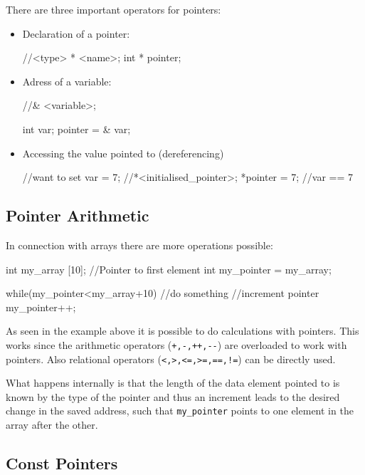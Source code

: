 \documentclass[10pt,a4paper]{scrartcl}
\begin{document}
\begin{multicols*}{2}
There are three important operators for pointers:

\begin{itemize}
\item Declaration of a pointer: 

\begin{TPCpp}
//<type> * <name>;
int * pointer;
\end{TPCpp}

\item Adress of a variable:

\begin{TPCpp}
//& <variable>;

int var;
pointer = & var;
\end{TPCpp}

\item Accessing the value pointed to (dereferencing)

\begin{TPCpp}
//want to set var = 7;
//*<initialised_pointer>;
*pointer = 7; //var == 7
\end{TPCpp}
\end{itemize}

\subsection{Pointer Arithmetic}
\label{sec:PointerArithmetic}

In connection with arrays there are more operations possible:

\begin{TPCpp}
int my_array [10];
//Pointer to first element
int my_pointer = my_array;

while(my_pointer<my_array+10){
	//do something
	//increment pointer
	my_pointer++;
}
\end{TPCpp}

As seen in the example above it is possible to do calculations with pointers. This works since the arithmetic operators (\verb.+,-,++,--.) are overloaded to work with pointers. Also relational operators (\verb.<,>,<=,>=,==,!=.) can be directly used.

What happens internally is that the length of the data element pointed to is known by the type of the pointer and thus an increment leads to the desired change in the saved address, such that \verb+my_pointer+ points to one element in the array after the other.

\subsection{Const Pointers}
\label{sec:ConstPointers}


\end{multicols*}
\end{document}
